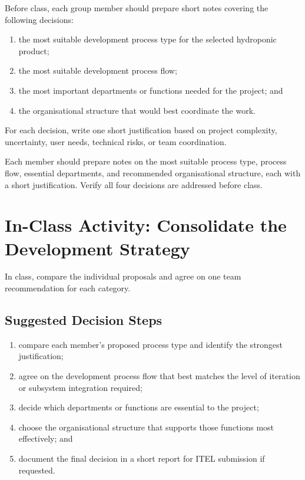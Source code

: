 Before class, each group member should prepare short notes covering the following decisions:
\begin{enumerate}
    \item the most suitable development process type for the selected hydroponic product;
    \item the most suitable development process flow;
    \item the most important departments or functions needed for the project; and
    \item the organisational structure that would best coordinate the work.
\end{enumerate}

For each decision, write one short justification based on project complexity, uncertainty, user needs, technical risks, or team coordination.

\begin{tcolorbox}[title=Checkpoint]
Each member should prepare notes on the most suitable process type, process flow, essential departments, and recommended organisational structure, each with a short justification. Verify all four decisions are addressed before class.
\end{tcolorbox}

\section{In-Class Activity: Consolidate the Development Strategy}

In class, compare the individual proposals and agree on one team recommendation for each category.

\subsection{Suggested Decision Steps}
\begin{enumerate}
    \item compare each member's proposed process type and identify the strongest justification;
    \item agree on the development process flow that best matches the level of iteration or subsystem integration required;
    \item decide which departments or functions are essential to the project;
    \item choose the organisational structure that supports those functions most effectively; and
    \item document the final decision in a short report for ITEL submission if requested.
\end{enumerate}

